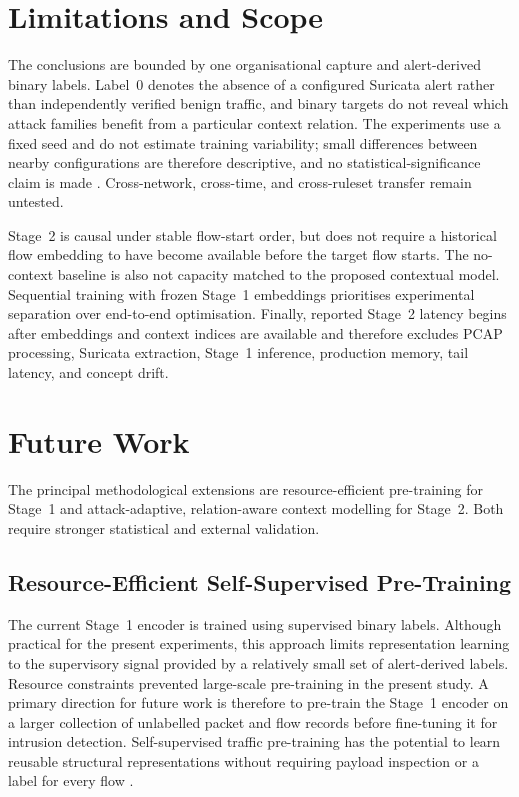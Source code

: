 \documentclass[11pt,fleqn]{report}
\begin{document}
\section{Limitations and Scope}
\label{subsec:conclusion_limitations}

The conclusions are bounded by one organisational capture and alert-derived binary labels. Label~0 denotes the absence of a configured Suricata alert rather than independently verified benign traffic, and binary targets do not reveal which attack families benefit from a particular context relation. The experiments use a fixed seed and do not estimate training variability; small differences between nearby configurations are therefore descriptive, and no statistical-significance claim is made \cite{ReimersGurevych2017,Bouthillier2021Variance}. Cross-network, cross-time, and cross-ruleset transfer remain untested.

Stage~2 is causal under stable flow-start order, but does not require a historical flow embedding to have become available before the target flow starts. The no-context baseline is also not capacity matched to the proposed contextual model. Sequential training with frozen Stage~1 embeddings prioritises experimental separation over end-to-end optimisation. Finally, reported Stage~2 latency begins after embeddings and context indices are available and therefore excludes PCAP processing, Suricata extraction, Stage~1 inference, production memory, tail latency, and concept drift.

\section{Future Work}
\label{subsec:conclusion_future_work}

The principal methodological extensions are resource-efficient pre-training for Stage~1 and attack-adaptive, relation-aware context modelling for Stage~2. Both require stronger statistical and external validation.

\subsection{Resource-Efficient Self-Supervised Pre-Training}
\label{subsubsec:future_pretraining}

The current Stage~1 encoder is trained using supervised binary labels. Although practical for the present experiments, this approach limits representation learning to the supervisory signal provided by a relatively small set of alert-derived labels. Resource constraints prevented large-scale pre-training in the present study. A primary direction for future work is therefore to pre-train the Stage~1 encoder on a larger collection of unlabelled packet and flow records before fine-tuning it for intrusion detection. Self-supervised traffic pre-training has the potential to learn reusable structural representations without requiring payload inspection or a label for every flow
\cite{2024MAETraffic,Dong2025EncryptedPretrain}.
\end{document}

